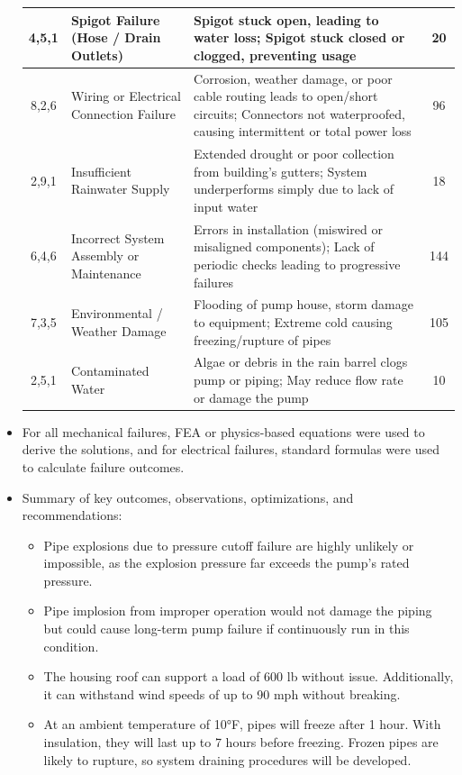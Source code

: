 \documentclass[12pt]{report}
\begin{document}
\begin{itemize}
\begin{longtable}{|c|p{4cm}|p{8cm}|c|}
\hline
4,5,1 & Spigot Failure (Hose / Drain Outlets) & Spigot stuck open, leading to water loss; Spigot stuck closed or clogged, preventing usage & 20 \\
\hline
8,2,6 & Wiring or Electrical Connection Failure & Corrosion, weather damage, or poor cable routing leads to open/short circuits; Connectors not waterproofed, causing intermittent or total power loss & 96 \\
\hline
2,9,1 & Insufficient Rainwater Supply & Extended drought or poor collection from building’s gutters; System underperforms simply due to lack of input water & 18 \\
\hline
6,4,6 & Incorrect System Assembly or Maintenance & Errors in installation (miswired or misaligned components); Lack of periodic checks leading to progressive failures & 144 \\
\hline
7,3,5 & Environmental / Weather Damage & Flooding of pump house, storm damage to equipment; Extreme cold causing freezing/rupture of pipes & 105 \\
\hline
2,5,1 & Contaminated Water & Algae or debris in the rain barrel clogs pump or piping; May reduce flow rate or damage the pump & 10 \\
\hline
\end{longtable}
    
    \item For all mechanical failures, FEA or physics-based equations were used to derive the solutions, and for electrical failures, standard formulas were used to calculate failure outcomes.
\item Summary of key outcomes, observations, optimizations, and recommendations:
    \begin{itemize}
        \item Pipe explosions due to pressure cutoff failure are highly unlikely or impossible, as the explosion pressure far exceeds the pump’s rated pressure.
        \item Pipe implosion from improper operation would not damage the piping but could cause long-term pump failure if continuously run in this condition.
        \item The housing roof can support a load of 600 lb without issue. Additionally, it can withstand wind speeds of up to 90 mph without breaking.
        \item At an ambient temperature of 10°F, pipes will freeze after 1 hour. With insulation, they will last up to 7 hours before freezing. Frozen pipes are likely to rupture, so system draining procedures will be developed.
    \end{itemize}


\end{itemize}
\end{document}

